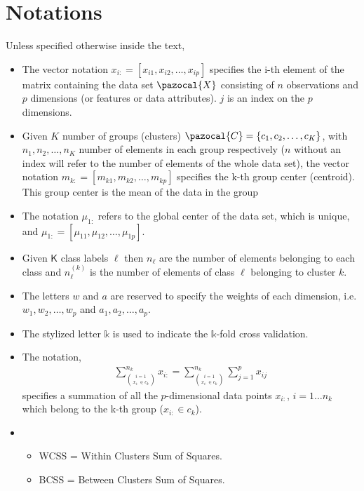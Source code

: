 \documentclass[12pt]{article}
\newcommand{\CC}{\pazocal{C}}
\newcommand{\CX}{\pazocal{X}}
\begin{document}
	
\section{Notations}

\noindent Unless specified otherwise inside the text,
\begin{itemize}
	\item The vector notation $x_{i:} = [x_{i1}, x_{i2}, \dots, x_{ip}]$ specifies the i-th element of the matrix containing the data set $\CX$ consisting of $n$ observations and $p$ dimensions (or features or data attributes). $j$ is an index on the $p$ dimensions.
	\item Given $K$ number of groups (clusters) $\CC = \{c_1, c_2, \dots, c_K \}$, with $n_1, n_2, \dots, n_K$ number of elements in each group respectively ($n$ without an index will refer to the number of elements of the whole data set), the vector notation $m_{k:} = [m_{k1}, m_{k2}, \dots, m_{kp}]$ specifies the k-th group center (centroid). This group center is the mean of the data in the group
	\item The notation $\mu_{1:}$ refers to the global center of the data set, which is unique, and $\mu_{1:} = [\mu_{11}, \mu_{12}, \dots, \mu_{1p}]$.
	\item Given $\mathsf{K}$ class labels $\ell$ 	then $n_{\ell}$
	are the number of elements belonging to each class and $n_{\ell}^{(k)}$ is the number of elements of class $\ell$ belonging to cluster $k$.
	\item The letters $w$ and $a$ are reserved to specify the weights of each dimension, i.e. $w_{1}, w_{2}, \dots, w_{p}$ and $a_{1}, a_{2}, \dots, a_{p}$.
	\item The stylized letter $\mathbb{k}$ is used to indicate the $\mathbb{k}$-fold cross validation.
	\item The notation, 
	\begin{align}\nonumber
	\sum_{\binom{i=1}{x_{i:} \in c_k}}^{n_k}x_{i:} = \sum_{\binom{i=1}{x_{i:} \in c_k}}^{n_k} \sum_{j=1}^{p} x_{ij}
	\end{align}
	specifies a summation of all the $p$-dimensional data points $x_{i:}$, $i = 1 \dots n_k$ which belong to the k-th group ($x_{i:} \in c_k$). 
	\item 
	\begin{itemize}
		\item WCSS = Within Clusters Sum of Squares.
		\item BCSS = Between Clusters Sum of Squares. 
	\end{itemize}	
\end{itemize}
\end{document}
